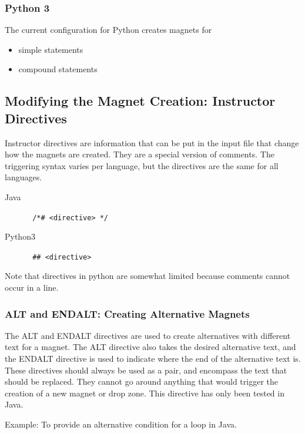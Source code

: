 \documentclass[letter,10pt]{article}
\begin{document}
\subsubsection{Python 3}
The current configuration for Python creates magnets for
\begin{itemize}
 \item simple statements
 \item compound statements
\end{itemize}


\subsection{Modifying the Magnet Creation: Instructor Directives}
Instructor directives are information that can be put in the input file 
that change how the magnets are created. They are a special version of 
comments. The triggering syntax varies per language, but the directives 
are the same for all languages.

\begin{description}
 \item [Java] \verb~ /*# <directive> */~
 \item [Python3] \verb~ ## <directive>~
\end{description}



Note that directives in python are somewhat limited because comments 
cannot occur in a line. 

\subsubsection{ALT and ENDALT: Creating Alternative Magnets}

The ALT and ENDALT directives are used to create alternatives with 
different text for a magnet. The ALT directive also takes the desired 
alternative text, and the ENDALT directive is used to indicate where 
the end of the alternative text is. These directives should always be 
used as a pair, and encompass the text that should be replaced. They 
cannot go around anything that would trigger the creation of a new 
magnet or drop zone. This directive has only been tested in 
Java.  

Example: To provide an alternative condition for a loop in Java.
\end{document}
